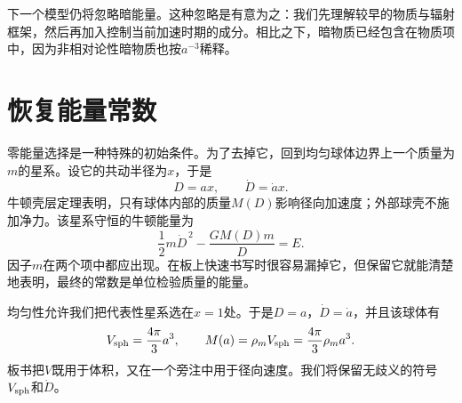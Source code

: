 \begin{classroomqa}
\end{classroomqa}

下一个模型仍将忽略暗能量。这种忽略是有意为之：我们先理解较早的物质与辐射框架，然后再加入控制当前加速时期的成分。相比之下，暗物质已经包含在物质项中，因为非相对论性暗物质也按\(a^{-3}\)稀释。

\begin{classroomqa}
\end{classroomqa}

\section{恢复能量常数}

零能量选择是一种特殊的初始条件。为了去掉它，回到均匀球体边界上一个质量为\(m\)的星系。设它的共动半径为\(x\)，于是
\begin{equation}
D=ax,
\qquad
\dot D=\dot a x.
\label{eq:c02-comoving-particle}
\end{equation}
牛顿壳层定理表明，只有球体内部的质量\(M(D)\)影响径向加速度；外部球壳不施加净力。该星系守恒的牛顿能量为
\begin{equation}
\frac{1}{2}m\dot D^{\,2}-\frac{GM(D)m}{D}=E.
\label{eq:c02-newton-energy}
\end{equation}
因子\(m\)在两个项中都应出现。在板上快速书写时很容易漏掉它，但保留它就能清楚地表明，最终的常数是单位检验质量的能量。

均匀性允许我们把代表性星系选在\(x=1\)处。于是\(D=a\)，\(\dot D=\dot a\)，并且该球体有
\begin{equation}
V_{\rm sph}=\frac{4\pi}{3}a^3,
\qquad
M(a)=\rho_m V_{\rm sph}=\frac{4\pi}{3}\rho_m a^3.
\label{eq:c02-enclosed-mass}
\end{equation}
板书把\(V\)既用于体积，又在一个旁注中用于径向速度。我们将保留无歧义的符号\(V_{\rm sph}\)和\(\dot D\)。

